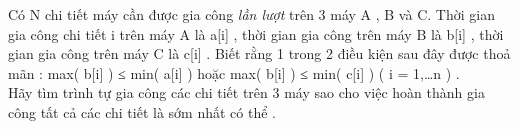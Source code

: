 Có N chi tiết máy cần được gia công   \textit{    lần lượt   }   trên 3 máy A , B và C. Thời gian gia công chi tiết i trên máy A là  a[i] , thời gian gia công trên máy B là b[i] , thời gian gia công trên máy C là c[i] . Biết rằng 1 trong 2 điều kiện sau đây được thoả mãn : max( b[i] ) ≤ min( a[i] ) hoặc max( b[i] ) ≤ min( c[i] ) ( i = 1,…n ) .   
\\   Hãy tìm trình tự gia công các chi tiết trên 3 máy sao cho việc hoàn thành gia công tất cả các chi tiết là sớm nhất có thể .